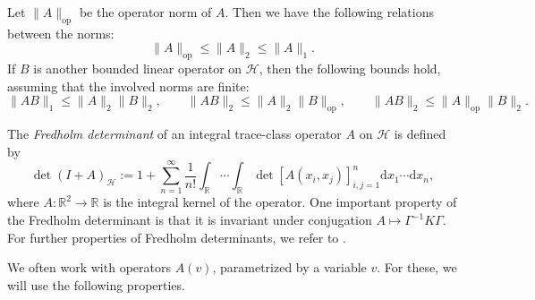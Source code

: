 \documentclass[oneside,final,11pt]{amsart}
\theoremstyle{definition}
\newcounter{assum}
\newcommand{\op}{\mathrm{op}}
\renewcommand{\d}{\mathrm{d}}
\newcommand{\R}{\mathbb{R}}
\newcommand{\CH}{\mathcal{H}}
\newcommand{\1}[1]{\mathbf{1}_{#1}}
\numberwithin{equation}{section}
\begin{document}
Let $\| A \|_\op$ be the operator norm of $A$. Then we have the following relations between the norms:
\begin{equation}\label{eq:norms}
\| A \|_\op \leq \| A \|_2 \leq \| A \|_1.
\end{equation}
If $B$ is another bounded linear operator on $\CH$, then the following bounds hold, assuming that the involved norms are finite:
\begin{equation}\label{eq:norms_products}
\| A B \|_1 \leq \| A \|_2 \| B \|_2, \qquad \| A B \|_2 \leq \| A \|_2 \| B \|_\op, \qquad \| A B \|_2 \leq \| A \|_\op \| B \|_2.
\end{equation}

The \emph{Fredholm determinant} of an integral trace-class operator $A$ on $\CH$ is defined by
\begin{equation}\label{eq:det}
\det(I + A)_{\CH} := 1 + \sum_{n = 1}^\infty \frac{1}{n!} \int_{\R} \cdots \int_{\R} \det[A(x_i, x_j)]_{i,j = 1}^n \d x_1 \cdots \d x_n,
\end{equation}
where $A : \R^2 \to \R$ is the integral kernel of the operator. One important property of the Fredholm determinant is that it is invariant under conjugation $A \mapsto \Gamma^{-1} K \Gamma$. For further properties of Fredholm determinants, we refer to \cite{Simon}.

We often work with operators $A(v)$, parametrized by a variable $v$. For these, we will use the following properties.
\end{document}
